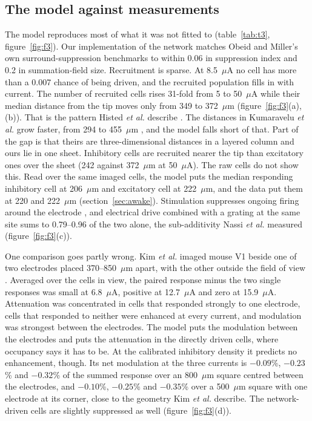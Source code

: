 \documentclass[10pt,twocolumn]{article}
\newcommand{\um}{\ensuremath{\mu\text{m}}}
\newcommand{\uA}{\ensuremath{\mu\text{A}}}
\begin{document}
\subsection{The model against measurements}
\label{sec:validation}

The model reproduces most of what it was not fitted to
(table~\ref{tab:t3}, figure~\ref{fig:f3}). Our implementation of the
network matches Obeid and Miller's own surround-suppression benchmarks to
within 0.06 in suppression index and 0.2\textdegree{} in summation-field
size. Recruitment is sparse. At 8.5~\uA{} no cell has more than a 0.007
chance of being driven, and the recruited population fills in with
current. The number of recruited cells rises 31-fold from 5 to 50~\uA{}
while their median distance from the tip moves only from 349 to 372~\um{}
(figure~\ref{fig:f3}(a),(b)). That is the pattern Histed \textit{et al.}
describe \citep{histed2009}. The distances in Kumaravelu \textit{et al.}
grow faster, from 294 to 455~\um{} \citep{kumaravelu2022}, and the model
falls short of that. Part of the gap is that theirs are three-dimensional
distances in a layered column and ours lie in one sheet. Inhibitory cells
are recruited nearer the tip than excitatory ones over the sheet (242
against 372~\um{} at 50~\uA). The raw cells do not show this. Read over
the same imaged cells, the model puts the median responding inhibitory
cell at 206~\um{} and excitatory cell at 222~\um, and the data put them at
220 and 222~\um{} (section~\ref{sec:awake}). Stimulation suppresses ongoing firing around the
electrode \citep{butovas2003}, and electrical drive combined with a
grating at the same site sums to 0.79--0.96 of the two alone, the
sub-additivity Nassi \textit{et al.} measured \citep{nassi2015}
(figure~\ref{fig:f3}(c)).

One comparison goes partly wrong. Kim \textit{et al.} imaged mouse V1
beside one of two electrodes placed 370--850~\um{} apart, with the other
outside the field of view \citep{kim2025}. Averaged over the cells in
view, the paired response minus the two single responses was small at
6.8~\uA, positive at 12.7~\uA{} and zero at 15.9~\uA. Attenuation was
concentrated in cells that responded strongly to one electrode, cells
that responded to neither were enhanced at every current, and modulation
was strongest between the electrodes. The model puts the modulation
between the electrodes and puts the attenuation in the directly driven
cells, where occupancy says it has to be. At the calibrated inhibitory
density it predicts no enhancement, though. Its net modulation at the
three currents is $-0.09$\%, $-0.23$\% and $-0.32$\% of the summed
response over an 800~\um{} square centred between the electrodes, and
$-0.10$\%, $-0.25$\% and $-0.35$\% over a 500~\um{} square with one
electrode at its corner, close to the geometry Kim \textit{et al.}
describe. The
network-driven cells are slightly suppressed as well
(figure~\ref{fig:f3}(d)).
\end{document}
